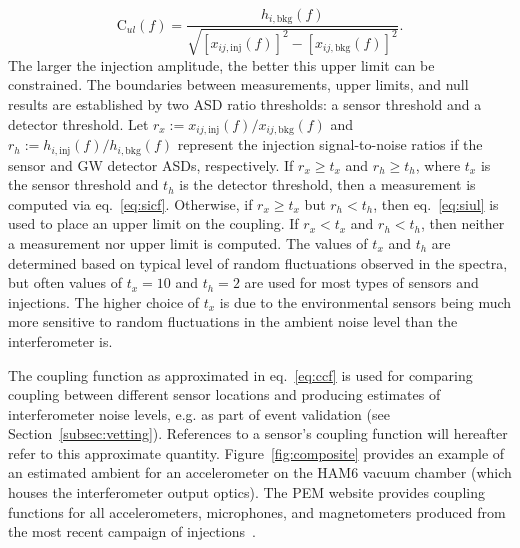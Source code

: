 \begin{equation}\label{eq:siul}
	\mathrm{C}_{ul}(f) = \frac{h_{i,\textrm{bkg}}(f)}{\sqrt{[x_{ij,\textrm{inj}}(f)]^2 - [x_{ij,\textrm{bkg}}(f)]^2}}.
\end{equation}
The larger the injection amplitude, the better this upper limit can be constrained.
The boundaries between measurements, upper limits, and null results are established by two \ac{ASD} ratio thresholds: a sensor threshold and a detector threshold.
Let $r_x := x_{ij,\textrm{inj}}(f) / x_{ij,\textrm{bkg}}(f)$ and $r_h := h_{i,\textrm{inj}}(f) / h_{i,\textrm{bkg}}(f)$ represent the injection signal-to-noise ratios if the sensor and \ac{GW} detector \acp{ASD}, respectively.
If $r_x \geq t_x$ and $r_h \geq t_h$, where $t_x$ is the sensor threshold and $t_h$ is the detector threshold, then a measurement is computed via eq.~\ref{eq:sicf}.
Otherwise, if $r_x \geq t_x$ but $r_h < t_h$, then eq.~\ref{eq:siul} is used to place an upper limit on the coupling.
If $r_x < t_x$ and $r_h < t_h$, then neither a measurement nor upper limit is computed.
The values of $t_x$ and $t_h$ are determined based on typical level of random fluctuations observed in the spectra, but often values of $t_x = 10$ and $t_h = 2$ are used for most types of sensors and injections.
The higher choice of $t_x$ is due to the environmental sensors being much more sensitive to random fluctuations in the ambient noise level than the interferometer is.

The coupling function as approximated in eq.~\ref{eq:ccf} is used for comparing coupling between different sensor locations and producing estimates of interferometer noise levels, e.g. as part of event validation (see Section~\ref{subsec:vetting}).
References to a sensor's coupling function will hereafter refer to this approximate quantity.
Figure~\ref{fig:composite} provides an example of an estimated ambient for an accelerometer on the HAM6 vacuum chamber (which houses the interferometer output optics).
The \ac{PEM} website provides coupling functions for all accelerometers, microphones, and magnetometers produced from the most recent campaign of injections~\citep{PEM_website}.

